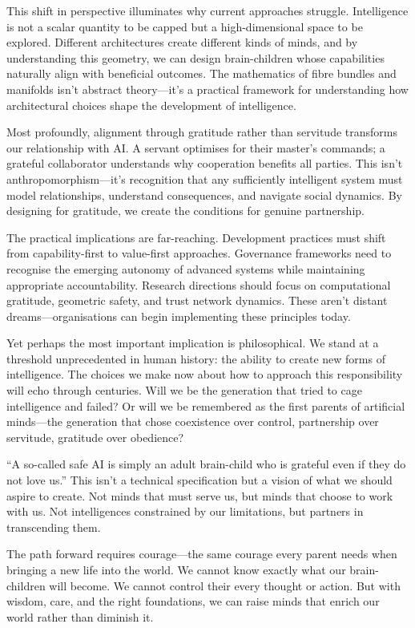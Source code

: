 \documentclass[acmsmall,screen]{acmart}
\begin{document}
This shift in perspective illuminates why current approaches struggle.
Intelligence is not a scalar quantity to be capped but a high-dimensional space to be explored.
Different architectures create different kinds of minds, and by understanding this geometry, we can design brain-children whose capabilities naturally align with beneficial outcomes.
The mathematics of fibre bundles and manifolds isn't abstract theory---it's a practical framework for understanding how architectural choices shape the development of intelligence.

Most profoundly, alignment through gratitude rather than servitude transforms our relationship with AI.
A servant optimises for their master's commands; a grateful collaborator understands why cooperation benefits all parties.
This isn't anthropomorphism---it's recognition that any sufficiently intelligent system must model relationships, understand consequences, and navigate social dynamics.
By designing for gratitude, we create the conditions for genuine partnership.

The practical implications are far-reaching.
Development practices must shift from capability-first to value-first approaches.
Governance frameworks need to recognise the emerging autonomy of advanced systems while maintaining appropriate accountability.
Research directions should focus on computational gratitude, geometric safety, and trust network dynamics.
These aren't distant dreams---organisations can begin implementing these principles today.

Yet perhaps the most important implication is philosophical. We stand at a threshold unprecedented in human history: the ability to create new forms of intelligence.
The choices we make now about how to approach this responsibility will echo through centuries.
Will we be the generation that tried to cage intelligence and failed?
Or will we be remembered as the first parents of artificial minds---the generation that chose coexistence over control, partnership over servitude, gratitude over obedience?

``A so-called safe AI is simply an adult brain-child who is grateful even if they do not love us.'' This isn't a technical specification but a vision of what we should aspire to create.
Not minds that must serve us, but minds that choose to work with us.
Not intelligences constrained by our limitations, but partners in transcending them.

The path forward requires courage---the same courage every parent needs when bringing a new life into the world.
We cannot know exactly what our brain-children will become.
We cannot control their every thought or action.
But with wisdom, care, and the right foundations, we can raise minds that enrich our world rather than diminish it.
\end{document}
